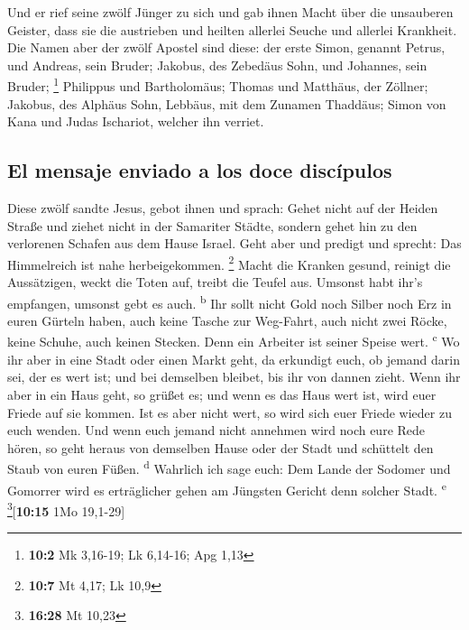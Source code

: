  Und er rief seine zwölf Jünger zu sich und gab ihnen
Macht über die unsauberen Geister, dass sie die austrieben und heilten
allerlei Seuche und allerlei Krankheit.  Die Namen aber
der zwölf Apostel sind diese: der erste Simon, genannt Petrus, und
Andreas, sein Bruder; Jakobus, des Zebedäus Sohn, und Johannes, sein
Bruder; \footnote{\textbf{10:2} Mk 3,16-19; Lk 6,14-16; Apg 1,13}
 Philippus und Bartholomäus; Thomas und Matthäus, der
Zöllner; Jakobus, des Alphäus Sohn, Lebbäus, mit dem Zunamen Thaddäus;
 Simon von Kana und Judas Ischariot, welcher ihn verriet.

\hypertarget{el-mensaje-enviado-a-los-doce-discuxedpulos}{%
\subsection{El mensaje enviado a los doce
discípulos}\label{el-mensaje-enviado-a-los-doce-discuxedpulos}}

 Diese zwölf sandte Jesus, gebot ihnen und sprach: Gehet
nicht auf der Heiden Straße und ziehet nicht in der Samariter Städte,
 sondern gehet hin zu den verlorenen Schafen aus dem Hause
Israel.  Geht aber und predigt und sprecht: Das
Himmelreich ist nahe herbeigekommen. \footnote{\textbf{10:7} Mt 4,17; Lk
  10,9}  Macht die Kranken gesund, reinigt die
Aussätzigen, weckt die Toten auf, treibt die Teufel aus. Umsonst habt
ihr's empfangen, umsonst gebt es auch. \textsuperscript{b}
 Ihr sollt nicht Gold noch Silber noch Erz in euren
Gürteln haben,  auch keine Tasche zur Weg-Fahrt, auch
nicht zwei Röcke, keine Schuhe, auch keinen Stecken. Denn ein Arbeiter
ist seiner Speise wert. \textsuperscript{c}  Wo ihr aber
in eine Stadt oder einen Markt geht, da erkundigt euch, ob jemand darin
sei, der es wert ist; und bei demselben bleibet, bis ihr von dannen
zieht.  Wenn ihr aber in ein Haus geht, so grüßet es;
 und wenn es das Haus wert ist, wird euer Friede auf sie
kommen. Ist es aber nicht wert, so wird sich euer Friede wieder zu euch
wenden.  Und wenn euch jemand nicht annehmen wird noch
eure Rede hören, so geht heraus von demselben Hause oder der Stadt und
schüttelt den Staub von euren Füßen. \textsuperscript{d} 
Wahrlich ich sage euch: Dem Lande der Sodomer und Gomorrer wird es
erträglicher gehen am Jüngsten Gericht denn solcher Stadt.
\textsuperscript{e} \footnote{\textbf{16:28} Mt 10,23}{[}\textbf{10:15}
1Mo 19,1-29{]}

